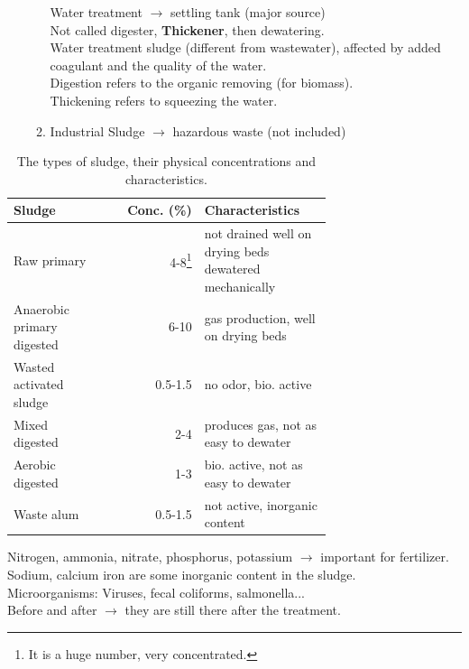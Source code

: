 \documentclass[12pt]{article}
\begin{document}
\begin{itemize}
\begin{enumerate}
    Water treatment $\rightarrow$ settling tank (major source)\\
    Not called digester, \textbf{Thickener}, then dewatering.\\
    Water treatment sludge (different from wastewater), affected by added coagulant and the quality of the water.\\
    Digestion  refers to the organic removing (for biomass).\\
    Thickening refers to squeezing the water.
    \item Industrial Sludge $\rightarrow$ hazardous waste (not included)
    \end{enumerate}
\end{itemize}

\begin{table}[h]
    \caption{The types of sludge, their physical concentrations and characteristics.}
    \label{tab:table_1}
    \centering
    \begin{tabular}{p{0.3\linewidth}rp{0.4\linewidth}}
        \toprule
        Sludge & Conc. (\%) & Characteristics \\
        \midrule
        Raw primary & 4-8\footnote{It is a huge number, very concentrated.} & not drained well on drying beds \newline dewatered mechanically\\
        Anaerobic primary digested & 6-10 & gas production, well on drying beds\\
        Wasted activated sludge & 0.5-1.5 & no odor, bio. active\\
        Mixed digested & 2-4 & produces gas, not as easy to dewater\\
        Aerobic digested & 1-3 & bio. active, not as easy to dewater\\
        Waste alum & 0.5-1.5 & not active, inorganic content\\
        \bottomrule
    \end{tabular}
\end{table}

Nitrogen, ammonia, nitrate, phosphorus, potassium $\rightarrow$ important for fertilizer.\\
Sodium, calcium iron are some inorganic content in the sludge.\\
Microorganisms: Viruses, fecal coliforms, salmonella...\\
Before and after $\rightarrow$ they are still there after the treatment.
\end{document}
